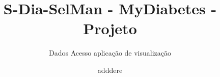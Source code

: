 \documentclass{beamer}
\title{S-Dia-SelMan - MyDiabetes - Projeto}
\subtitle{Dados Acesso aplicação de visualização}
\author{adddere}
\date{}
\institute{\url{mydiabetes@dcc.fc.up.pt}\\\url{http://mydiabetes.dcc.fc.up.py/}}
\begin{document}
\begin{frame}[plain,t]
\titlepage
\end{frame}


%
%
%
%
%
%
%
\end{document}
